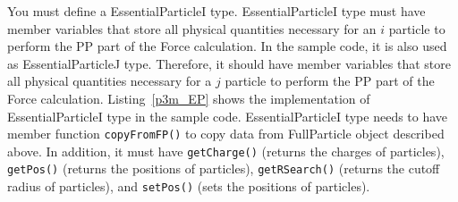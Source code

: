You must define a \textsf{EssentialParticleI} type. \textsf{EssentialParticleI} type must have member variables that store all physical quantities necessary for an $i$ particle to perform the PP part of the Force calculation. In the sample code, it is also used as \textsf{EssentialParticleJ} type. Therefore, it should have member variables that store all physical quantities necessary for a $j$ particle to perform the PP part of the Force calculation. Listing~\ref{p3m_EP} shows the implementation of \textsf{EssentialParticleI} type in the sample code. 
\ifCpp
\textsf{EssentialParticleI} type needs to have member function \texttt{copyFromFP()} to copy data from \textsf{FullParticle} object described above. In addition, it must have \texttt{getCharge()} (returns the charges of particles), \texttt{getPos()} (returns the positions of particles), \texttt{getRSearch()} (returns the cutoff radius of particles), and \texttt{setPos()} (sets the positions of particles).
\endifCpp

\ifCpp

\endifCpp
\ifFtn

\endifFtn
\ifC

\endifC

